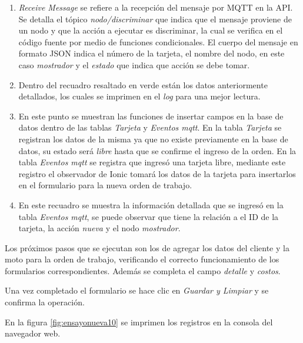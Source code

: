 \begin{enumerate}
\item \textit{Receive Message} se refiere a la recepción del mensaje por MQTT en la API. Se detalla el tópico \textit{nodo/discriminar} que indica que el mensaje proviene de un nodo y que la acción a ejecutar es discriminar, la cual se verifica en el código fuente por medio de funciones condicionales. El cuerpo del mensaje en formato JSON indica  el número de la tarjeta, el nombre del nodo, en este caso \textit{mostrador} y el \textit{estado} que indica que acción se debe tomar.

\item Dentro del recuadro resaltado en verde están los datos anteriormente detallados, los cuales se imprimen en el \textit{log} para una mejor lectura.

\item En este punto se muestran las funciones de insertar campos en la base de datos dentro de las tablas \textit{Tarjeta} y \textit{Eventos mqtt}. En la tabla \textit{Tarjeta} se registran los datos de la misma ya que no existe previamente en la base de datos, su estado será \textit{libre} hasta que se confirme el ingreso de la orden. En la tabla \textit{Eventos mqtt} se registra que ingresó una tarjeta libre, mediante este registro el observador de Ionic tomará los datos de la tarjeta para insertarlos en el formulario para la nueva orden de trabajo.

\item En este recuadro se muestra la información detallada que se ingresó en la tabla \textit{Eventos mqtt}, se puede observar que tiene la relación a el ID de la tarjeta, la acción \textit{nueva} y el nodo \textit{mostrador}.
\end{enumerate}

Los próximos pasos que se ejecutan son los de agregar los datos del cliente y la moto para la orden de trabajo, verificando el correcto funcionamiento de los formularios correspondientes. Además se completa el campo \textit{detalle} y \textit{costos}.

Una vez completado el formulario se hace clic en \textit{Guardar y Limpiar} y se confirma la operación.

En la figura \ref{fig:ensayonueva10} se imprimen los registros en la consola del navegador web.

